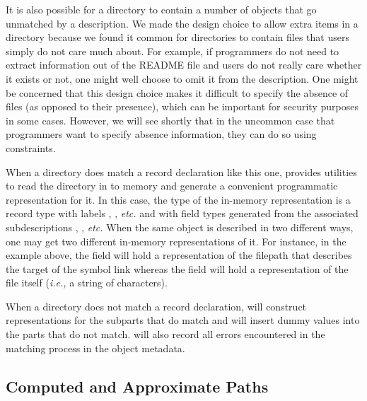 \documentclass[natbib]{sigplanconf}
\begin{document}
It is also possible for a directory to contain a number of objects that go unmatched by
a description.  We made the design choice to allow extra items in
a directory because we found it common for directories to contain files that users
simply do not care much about.  For example,
if programmers do not need to extract information out of the README file and
users do not really care whether it exists or not, one might well choose
to omit it from the description.  One might be concerned that this design choice makes it difficult to specify
the absence of files (as opposed to their presence), which can be important
for security purposes in some cases.  However, we will see shortly that in the
uncommon case that programmers want to specify absence information, they can
do so using constraints.

When a directory does match a record declaration like this one, 
\forest{} provides utilities to read the directory in
to memory and generate a convenient programmatic representation for it.  
In this case, the type of the in-memory representation is a record type
with labels , , {\em etc.} and with field types
generated from the associated \forest{} subdescriptions , ,
{\em etc.}  When the same object is described in two different ways, one may
get two different in-memory representations of it.  For instance, in the example above,
the  field will hold a representation of the filepath that describes the target of the
symbol link whereas the  field will hold a representation of the 
file itself ({\em i.e.,} a string of characters).

When a directory does not match a record declaration, \forest{} will
construct representations for the subparts that do match and will insert dummy values
into the parts that do not match.  \forest{} will also record all errors encountered in the
matching process in the object metadata.

\subsection{Computed and Approximate Paths}
\label{sec:computed-pathes}
\end{document}
